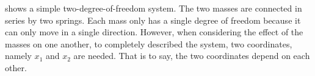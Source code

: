    shows a simple two-degree-of-freedom system. The two masses are connected in series by two springs. Each mass only has a single degree of freedom because it can only move in a single direction. However, when considering the effect of the masses on one another, to completely described the system, two coordinates, namely $x_{1}$ and $x_{2}$ are needed. That is to say, the two coordinates depend on each other.
